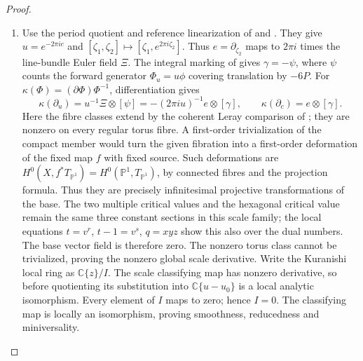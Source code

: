 \begin{proof}
\begin{enumerate}[label=\arabic*.,leftmargin=*]
\item Use the period quotient and reference linearization of
 and . They give
$u=e^{-2\pi ic}$ and
$[\zeta_1,\zeta_2]\mapsto[\zeta_1,e^{2\pi i\zeta_2}]$.
Thus $e=\partial_{\zeta_2}$ maps to $2\pi i$ times the line-bundle
Euler field $\Xi$. The integral marking of 
gives $\gamma=-\psi$, where $\psi$ counts the forward generator
$\Phi_u=u\phi$ covering translation by $-6P$.
For $\kappa(\Phi)=(\partial\Phi)\Phi^{-1}$, differentiation gives
\[
 \kappa(\partial_u)=u^{-1}\Xi\otimes[\psi]
       =-(2\pi iu)^{-1}e\otimes[\gamma],\qquad
 \kappa(\partial_c)=e\otimes[\gamma].
\]
Here the fibre classes extend by the coherent Leray comparison of
; they are nonzero on every regular torus
fibre. A first-order trivialization of
the compact member would turn the given fibration into a
first-order deformation of the fixed map $f$ with fixed source.
Such deformations are $H^0(X,f^*T_{\mathbb P^1})
=H^0(\mathbb P^1,T_{\mathbb P^1})$, by connected fibres and
the projection formula. Thus they are precisely infinitesimal
projective transformations of the base. The two multiple critical
values and the hexagonal critical value remain the same three
constant sections in this scale family; the local equations
$t=v^r$, $t-1=v^s$, $q=xyz$ show this also over the dual numbers.
The base vector field is therefore zero. The nonzero torus class
cannot be trivialized, proving the nonzero global scale derivative.
Write the Kuranishi local ring as $\mathbb C\{z\}/I$. The scale
classifying map has nonzero derivative, so before quotienting its
substitution into $\mathbb C\{u-u_0\}$ is a local analytic
isomorphism. Every element of $I$ maps to zero; hence $I=0$. The
classifying map is locally an isomorphism, proving smoothness,
reducedness and miniversality.

\end{enumerate}
\end{proof}